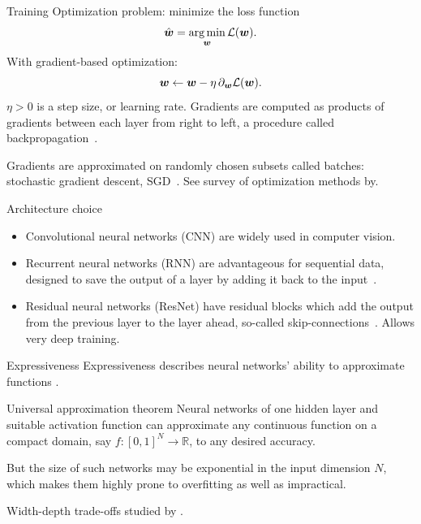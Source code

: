 \documentclass[9pt,handout]{beamer}
\begin{document}
\begin{frame}{Training}
Optimization problem: minimize the loss function
\begin{equation*}
    \hat {\boldsymbol{w}} = \operatorname*{arg\,min}_{\boldsymbol{w}} \mathcal{L}(\boldsymbol{w}).
\end{equation*}
With gradient-based optimization: 
\begin{equation*}
    \boldsymbol{w} \leftarrow \boldsymbol{w} - \eta\, \partial_{\boldsymbol{w}} \mathcal{L}(\boldsymbol{w}).
\end{equation*}
$\eta > 0$ is a \alert{step size}, or \alert{learning rate}. Gradients are computed as products of gradients between each layer \alert{from right to left}, a procedure called \alert{backpropagation}~\citep{rumelhart1986learning}.

Gradients are approximated on randomly chosen subsets called \alert{batches}: stochastic gradient descent, SGD~\citep{robbins1951stochastic}. See survey of optimization methods by\citet{sun2019survey}.
\end{frame}



\begin{frame}{Architecture choice}

\begin{itemize}
	\item \alert{Convolutional neural networks (CNN)} are widely used in computer vision.
	\item \alert{Recurrent neural networks (RNN)} are advantageous for sequential data, designed to save the output of a layer by adding it back to the input~\citep{hochreiter1997long}.
	\item \alert{Residual neural networks (ResNet)} have residual blocks which add the output from the previous layer to the layer ahead, so-called \alert{skip-connections}~\citep{he2016deep}. Allows very deep  training.
\end{itemize}
\end{frame}



\begin{frame}{Expressiveness}
Expressiveness describes neural networks’ ability to approximate functions \citep{cybenko1989approximation, funahashi1989approximate, hornik1989multilayer,barron1994approximation}. 

\begin{block}{Universal approximation theorem}
	Neural networks of one hidden layer and suitable activation function can approximate any continuous function on a compact domain, say $f: [0,1]^N \to \mathbb{R}$, to any desired accuracy.
\end{block}

\alert{But} the size of such networks may be \alert{exponential in the input dimension $N$}, which makes them highly prone to overfitting as well as impractical.

Width-depth trade-offs studied by \citet{chatziafratis2020depth,chatziafratis2020better}.

\end{frame}
\end{document}
